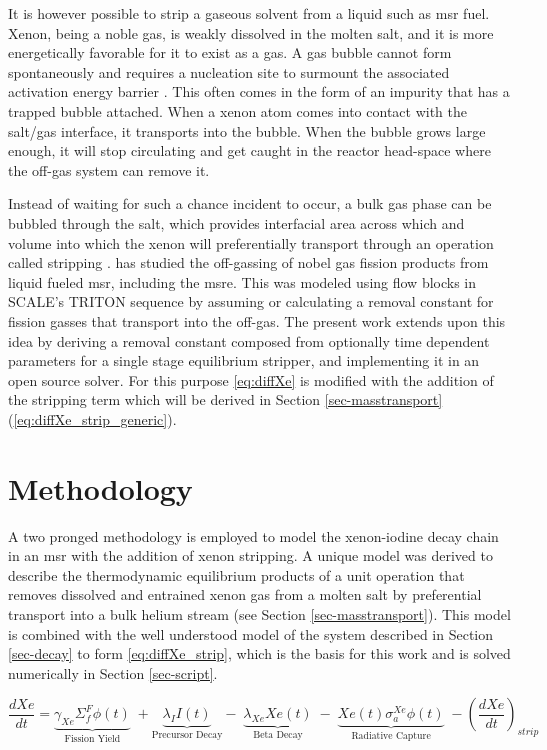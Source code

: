 It is however possible to strip a gaseous solvent from a liquid such as \acs{msr} fuel. Xenon, being a noble gas, is weakly dissolved in the molten salt, and it is more energetically favorable for it to exist as a gas. A gas bubble cannot form spontaneously and requires a nucleation site to surmount the associated activation energy barrier \cite{reviewXeMSR}. This often comes in the form of an impurity that has a trapped bubble attached. When a xenon atom comes into contact with the salt/gas interface, it transports into the bubble. When the bubble grows large enough, it will stop circulating and get caught in the reactor head-space where the off-gas system can remove it. 

Instead of waiting for such a chance incident to occur, a bulk gas phase can be bubbled through the salt, which provides interfacial area across which and volume into which the xenon will preferentially transport through an operation called stripping \cite[Ch. 10]{Geankoplis}. \cite{ORIGEN} has studied the off-gassing of nobel gas fission products from liquid fueled \acs{msr}, including the \acs{msre}. This was modeled using flow blocks in SCALE's TRITON sequence by assuming or calculating a removal constant for fission gasses that transport into the off-gas. The present work extends upon this idea by deriving a removal constant composed from optionally time dependent parameters for a single stage equilibrium stripper, and implementing it in an open source solver. For this purpose \ref{eq:diffXe} is modified with the addition of the stripping term which will be derived in Section \ref{sec-masstransport} (\ref{eq:diffXe_strip_generic}).

\section{Methodology}\label{sec-meth}
A two pronged methodology is employed to model the xenon-iodine decay chain in an \acs{msr} with the addition of xenon stripping. A unique model was derived to describe the thermodynamic equilibrium products of a unit operation that removes dissolved and entrained xenon gas from a molten salt by preferential transport into a bulk helium stream (see Section \ref{sec-masstransport}). This model is combined with the well understood model of the \Xe system described in Section \ref{sec-decay} to form \ref{eq:diffXe_strip}, which is the basis for this work and is solved numerically in Section \ref{sec-script}. 

\begin{equation} \label{eq:diffXe_strip_generic}
    \frac{dXe}{dt} =
        \underbrace{\gamma_{Xe}\Sigma_{f}^{F}{\phi}(t)}_{\text{Fission Yield}}\;+\underbrace{\lambda_{I}I(t)}_{\text{Precursor Decay}}
        -\;\underbrace{\lambda_{Xe}Xe(t)}_{\text{Beta Decay}}
        \;-\;\underbrace{Xe(t)\sigma_{a}^{Xe}{\phi}(t)}_{\text{Radiative Capture}}
        \;-\left(\frac{dXe}{dt}\right)_{strip}
\end{equation}

